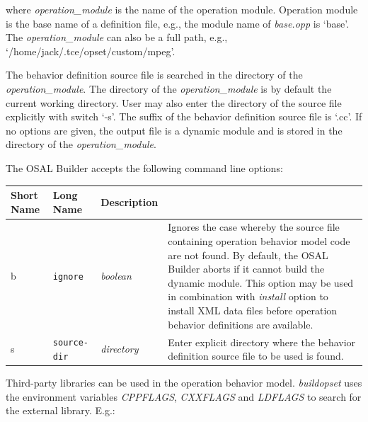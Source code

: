 \documentclass[twoside]{tceusermanual}
\begin{document}

where \emph{operation\_module} is the name of the operation module. 
Operation module is the base name of a definition file, e.g., the module
name of \emph{base.opp} is `base'. The \emph{operation\_module} can also be
a full path, e.g., `/home/jack/.tce/opset/custom/mpeg'.

The behavior definition source file is searched in the directory of the
\emph{operation\_module}. The directory of the \emph{operation\_module} is
by 
default the current working directory. User may also enter the directory of
the source file explicitly with switch `-s'. The suffix of the
behavior definition source file is `.cc'.
%
If no options are given, the output file is a dynamic module and is stored
in the directory of the \emph{operation\_module}.  

The OSAL Builder accepts the following command line options:

\begin{center}
\begin{longtable}[htb]{@{}p{}@{}p{}@{}p{}%
                     @{}p{}}

\textbf{Short Name} &\textbf{Long Name} &\textbf{Description} \\
\hline

b & \verb|ignore|         & \emph{boolean} &

Ignores the case whereby the source file containing operation behavior model
code are not found.  By default, the OSAL Builder aborts if it cannot build
the dynamic module.  This option may be used in combination with
\emph{install} option to install XML data files before operation behavior
definitions are available.\\

s & \verb|source-dir|         & \emph{directory} &

Enter explicit directory where the behavior definition source file to
be used is found.

\end{longtable}
\end{center}

Third-party libraries can be used in the operation behavior model.
\emph{buildopset} uses the environment variables \emph{CPPFLAGS}, 
\emph{CXXFLAGS} and \emph{LDFLAGS} to search for the external library. E.g.: 

\end{document}
